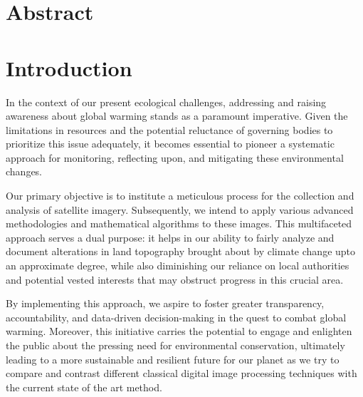 \documentclass[12pt,a4paper,IEEEtran]{article}
\begin{document}







\newpage
\section{Abstract}

\section{Introduction}
In the context of our present ecological challenges, addressing and raising awareness about global warming stands as a paramount imperative. Given the limitations in resources and the potential reluctance of governing bodies to prioritize this issue adequately, it becomes essential to pioneer a systematic approach for monitoring, reflecting upon, and mitigating these environmental changes. 

Our primary objective is to institute a meticulous process for the collection and analysis of satellite imagery. Subsequently, we intend to apply various advanced methodologies and mathematical algorithms to these images. This multifaceted approach serves a dual purpose: it helps in our ability to fairly analyze and document alterations in land topography brought about by climate change upto an approximate degree, while also diminishing our reliance on local authorities and potential vested interests that may obstruct progress in this crucial area.

By implementing this approach, we aspire to foster greater transparency, accountability, and data-driven decision-making in the quest to combat global warming. Moreover, this initiative carries the potential to engage and enlighten the public about the pressing need for environmental conservation, ultimately leading to a more sustainable and resilient future for our planet as we try to compare and contrast different classical digital image processing techniques with the current state of the art method.
\end{document}
